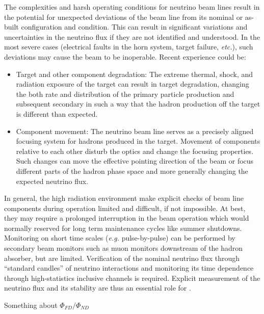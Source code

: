 The complexities and harsh operating conditions for neutrino beam lines result in the potential for unexpected deviations of the beam line from its nominal or as-built configuration and condition. This can result in significant variations and uncertainties in the neutrino flux if they are not identified and understood. In the most severe cases (electrical faults in the horn system, target failure, {\em etc.}), such deviations may cause the beam to be inoperable. Recent experience could be:
\begin{itemize}
    \item Target and other component degradation: The extreme thermal, shock, and radiation exposure of the target can result in target degradation, changing the both rate and distribution of the primary particle production and subsequent secondary in such a way that the hadron production off the target is different than expected.
    \item Component movement: The neutrino beam line serves as a precisely aligned focusing system for hadrons produced in the target. Movement of components relative to each other disturb the optics and change the focusing properties. Such changes can move the effective pointing direction of the beam or focus different parts of the hadron phase space and more generally changing the expected neutrino flux. 
\end{itemize}
In general, the high radiation environment make explicit checks of beam line components during operation limited and difficult, if not impossible. At best, they may require a prolonged interruption in the beam operation which would normally reserved for long term maintenance cycles like summer shutdowns. Monitoring on short time scales ({\em e.g.} pulse-by-pulse) can be performed by secondary beam monitors such as muon monitors downstream of the hadron absorber, but are limited. Verification of the nominal neutrino flux through ``standard candles'' of neutrino interactions and monitoring its time dependence through high-statistics inclusive channels is required. Explicit measurement of the neutrino flux and its stability are thus an essential role for . 

Something about $\Phi_{FD}/\Phi_{ND}$

